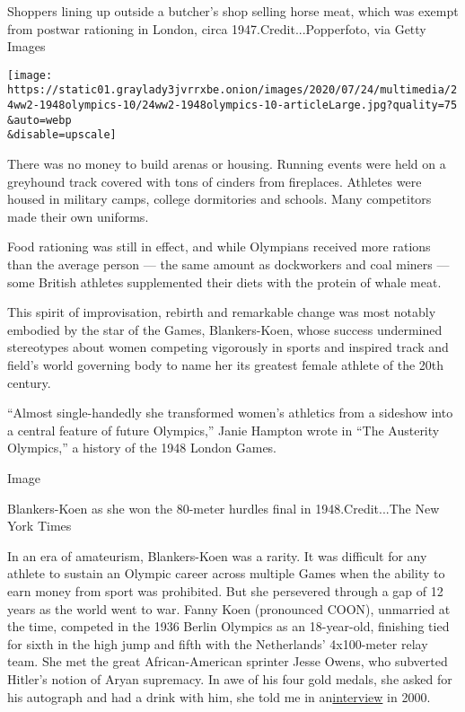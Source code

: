 Shoppers lining up outside a butcher's shop selling horse meat, which
was exempt from postwar rationing in London, circa
1947.Credit...Popperfoto, via Getty Images

\texttt{[image: https://static01.graylady3jvrrxbe.onion/images/2020/07/24/multimedia/24ww2-1948olympics-10/24ww2-1948olympics-10-articleLarge.jpg?quality=75\\\&auto=webp\\\&disable=upscale]}

There was no money to build arenas or housing. Running events were held
on a greyhound track covered with tons of cinders from fireplaces.
Athletes were housed in military camps, college dormitories and schools.
Many competitors made their own uniforms.

Food rationing was still in effect, and while Olympians received more
rations than the average person --- the same amount as dockworkers and
coal miners --- some British athletes supplemented their diets with the
protein of whale meat.

This spirit of improvisation, rebirth and remarkable change was most
notably embodied by the star of the Games, Blankers-Koen, whose success
undermined stereotypes about women competing vigorously in sports and
inspired track and field's world governing body to name her its greatest
female athlete of the 20th century.

``Almost single-handedly she transformed women's athletics from a
sideshow into a central feature of future Olympics,'' Janie Hampton
wrote in ``The Austerity Olympics,'' a history of the 1948 London Games.

Image

Blankers-Koen as she won the 80-meter hurdles final in 1948.Credit...The
New York Times

In an era of amateurism, Blankers-Koen was a rarity. It was difficult
for any athlete to sustain an Olympic career across multiple Games when
the ability to earn money from sport was prohibited. But she persevered
through a gap of 12 years as the world went to war. Fanny Koen
(pronounced COON), unmarried at the time, competed in the 1936 Berlin
Olympics as an 18-year-old, finishing tied for sixth in the high jump
and fifth with the Netherlands' 4x100-meter relay team. She met the
great African-American sprinter Jesse Owens, who subverted Hitler's
notion of Aryan supremacy. In awe of his four gold medals, she asked for
his autograph and had a drink with him, she told me in
an\href{https://archive.nytimes3xbfgragh.onion/www.nytimes3xbfgragh.onion/library/sports/olympics/071100oly-longman-column.html}{interview}
in 2000.

